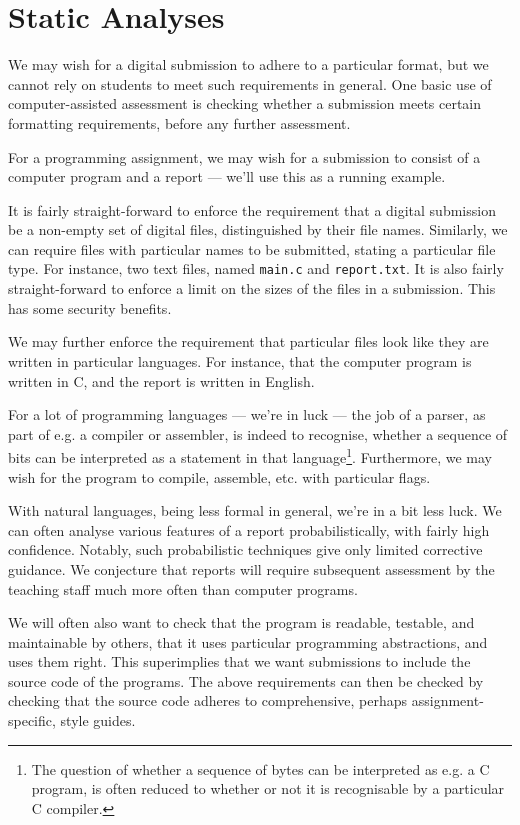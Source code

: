 
\section{Static Analyses}

We may wish for a digital submission to adhere to a particular format, but we
cannot rely on students to meet such requirements in general. One basic use of
computer-assisted assessment is checking whether a submission meets certain
formatting requirements, before any further assessment.

For a programming assignment, we may wish for a submission to consist of a
computer program and a report --- we'll use this as a running example.

It is fairly straight-forward to enforce the requirement that a digital
submission be a non-empty set of digital files, distinguished by their file
names. Similarly, we can require files with particular names to be submitted,
stating a particular file type.  For instance, two text files, named
\texttt{main.c} and \texttt{report.txt}. It is also fairly straight-forward to
enforce a limit on the sizes of the files in a submission.  This has some
security benefits. %

We may further enforce the requirement that particular files look like they are
written in particular languages. For instance, that the computer program is
written in C, and the report is written in English.

For a lot of programming languages --- we're in luck --- the job of a parser,
as part of e.g. a compiler or assembler, is indeed to recognise, whether a
sequence of bits can be interpreted as a statement in that
language\footnote{The question of whether a sequence of bytes can be
interpreted as e.g. a C program, is often reduced to whether or not it is
recognisable by a particular C compiler.}. Furthermore, we may wish for the
program to compile, assemble, etc. with particular flags.

With natural languages, being less formal in general, we're in a bit less luck.
We can often analyse various features of a report probabilistically, with
fairly high confidence. Notably, such probabilistic techniques give only
limited corrective guidance. We conjecture that reports will require subsequent
assessment by the teaching staff much more often than computer programs.

We will often also want to check that the program is readable, testable, and
maintainable by others, that it uses particular programming abstractions, and
uses them right. This superimplies that we want submissions to include the
source code of the programs. The above requirements can then be checked by
checking that the source code adheres to comprehensive, perhaps
assignment-specific, style guides.

